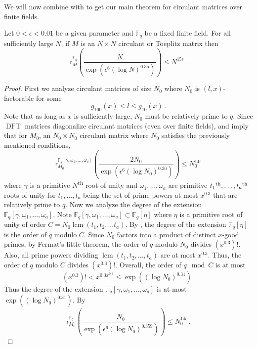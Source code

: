 \documentclass{toc}
\newcommand\F{{\mathbb{F}}}
\DeclareMathOperator{\lcm}{lcm}
\newcommand{\ts}{\textsuperscript}
\DeclareMathOperator{\DFT}{DFT}
\begin{document}
We will now combine  with  to get our main theorem for circulant matrices over finite fields.  
\begin{theorem}\label{circulant_finitefield}
Let $0 < \epsilon < 0.01$ be a given parameter and $\F_q$ be a fixed finite field.  For all sufficiently large $N$, if $M$ is an $N \times N$ %
 circulant or Toeplitz matrix %
 then   %
\[
\textsf{r}_{M}^{\F_q}\left(\frac{N}{\exp\left(\epsilon^6(\log N)^{0.35}\right)}\right) \leq N^{15 \epsilon} \,.
\]
\end{theorem}
\begin{proof}
First we analyze circulant matrices of size $N_0$ where $N_0$ is $(l,x)$-factorable for some 
\[
g_{100}(x) \leq l \leq g_{10}(x) \,.
\]
Note that as long as $x$ is sufficiently large, $N_0$ must be relatively prime to $q$.  Since $\DFT$ matrices  diagonalize circulant matrices (even over finite fields),  and  imply that for $M_0$, an $N_0 \times N_0$ circulant matrix where $N_0$ satisfies the previously mentioned 
%
conditions, %
\[
\textsf{r}_{M_0}^{\F_q[\gamma, \omega_1, \dots , \omega_a]}\left(\frac{2N_0}{\exp\left(\epsilon^6(\log N_0)^{0.36}\right)}\right) \leq N_0^{14 \epsilon} 
\]
where $\gamma$ is a primitive $N$\ts{th} root of unity and $\omega_1, \dots , \omega_a$ are primitive $t_1\ts{th}, \dots , t_a\ts{th}$ roots of unity for $t_1, \dots , t_a$ being the set of prime powers at most $x^{0.3}$ that are relatively prime to $q$.  Now we analyze the degree of the extension $\F_q[\gamma, \omega_1, \dots , \omega_a]$.  Note $\F_q[\gamma, \omega_1, \dots , \omega_a] \subset \F_q[\eta]$ where $\eta$ is a primitive root of unity of order $C = N_0\lcm(t_1,t_2,\dots t_a)$.  By 
,  %
the degree of the extension $\F_q[\eta]$ is the order of $q$ modulo $C$. %
Since $N_0$ factors into a product of distinct $x$-good primes, %
%
by Fermat's little theorem, the order of $q$ modulo $N_0$ divides $\left(x^{0.3}\right)!$.  Also, all prime powers dividing $\lcm(t_1,t_2,\dots, t_a)$ are at most $x^{0.3}$.  Thus, the order of $q$ modulo $C$ divides $\left(x^{0.3}\right)!$.  Overall, the order of $q \mod C$ is at most
\[
\left(x^{0.3}\right)! < x^{0.3x^{0.3}} \leq \exp\left((\log N_0)^{0.31}\right) \,.
\]
Thus the degree of the extension $\F_q[\gamma, \omega_1, \dots , \omega_a]$ is at most $\exp\left((\log N_0)^{0.31}\right)$.  By 
\[
\textsf{r}_{M_0}^{\F_q}\left(\frac{N_0}{\exp\left(\epsilon^6(\log N_0)^{0.359}\right)}\right) \leq N_0^{14 \epsilon} \,.
\]
\end{proof}
\end{document}
